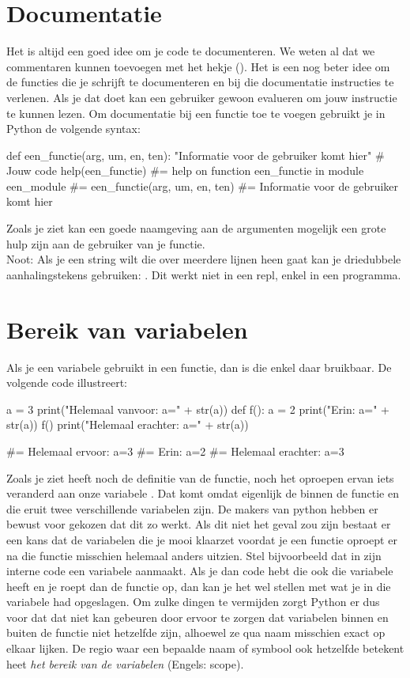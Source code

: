 \section{Documentatie}
  Het is altijd een goed idee om je code te documenteren. We weten al dat we
  commentaren kunnen toevoegen met het hekje (\py{\#}). Het is een nog beter
  idee om de functies die je schrijft te documenteren en bij die documentatie
  instructies te verlenen. Als je dat doet kan een gebruiker gewoon
   evalueren om jouw instructie te kunnen lezen. Om
  documentatie bij een functie toe te voegen gebruikt je in Python de volgende
  syntax:
  \begin{python}
    def een_functie(arg, um, en, ten):
      "Informatie voor de gebruiker komt hier"
      # Jouw code
    help(een_functie)
    #= help on function een_functie in module een_module
    #= een_functie(arg, um, en, ten)
    #=     Informatie voor de gebruiker komt hier
  \end{python}
  Zoals je ziet kan een goede naamgeving aan de argumenten mogelijk een grote
  hulp zijn aan de gebruiker van je functie.\\
  Noot: Als je een string wilt die over meerdere lijnen heen gaat kan je
  driedubbele aanhalingstekens gebruiken: .
  Dit werkt  niet in een repl, enkel in een programma.
\section{Bereik van variabelen}
  Als je een variabele gebruikt in een functie, dan is die enkel daar bruikbaar.
  De volgende code illustreert:
  \begin{python}
    a = 3
    print("Helemaal vanvoor: a=" + str(a))
    def f():
      a = 2
      print("Erin: a=" + str(a))
    f()
    print("Helemaal erachter: a=" + str(a))

    #= Helemaal ervoor: a=3
    #= Erin: a=2
    #= Helemaal erachter: a=3
  \end{python}
  Zoals je ziet heeft noch de definitie van de functie, noch het oproepen ervan
  iets veranderd aan onze variabele . Dat komt omdat eigenlijk de 
  binnen de functie en die eruit twee verschillende variabelen zijn. De makers
  van python hebben er bewust voor gekozen dat dit zo werkt. Als dit niet het
  geval zou zijn bestaat er een kans dat de variabelen die je mooi klaarzet
  voordat je een functie oproept er na die functie misschien helemaal anders
  uitzien. Stel bijvoorbeeld dat  in zijn interne code een variabele
   aanmaakt. Als je dan code hebt die ook die variabele  heeft
  en je roept dan de functie op, dan kan je het wel stellen met wat je
  in die variabele had opgeslagen. Om zulke dingen te vermijden zorgt Python er
  dus voor dat dat niet kan gebeuren door ervoor te zorgen dat variabelen binnen
  en buiten de functie niet hetzelfde zijn, alhoewel ze qua naam misschien exact
  op elkaar lijken. De regio waar een bepaalde naam of symbool ook hetzelfde
  betekent heet \emph{het bereik van de variabelen} (Engels: scope).
